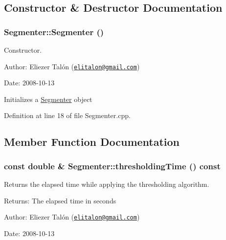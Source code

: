 \subsection{Constructor \& Destructor Documentation}
\hypertarget{class_segmenter_d39ec3bda31be180820aa0bdca7b125d}{
\subsubsection[Segmenter]{\setlength{\rightskip}{0pt plus 5cm}Segmenter::Segmenter ()}}
\label{class_segmenter_d39ec3bda31be180820aa0bdca7b125d}


Constructor. 

\begin{Desc}
\item[Author:]Eliezer Talón (\href{mailto:elitalon@gmail.com}{\tt elitalon@gmail.com}) \end{Desc}
\begin{Desc}
\item[Date:]2008-10-13\end{Desc}
Initializes a \hyperlink{class_segmenter}{Segmenter} object 

Definition at line 18 of file Segmenter.cpp.

\subsection{Member Function Documentation}
\hypertarget{class_segmenter_52f771c61d667df4f552ee73dc9f22e7}{
\subsubsection[thresholdingTime]{\setlength{\rightskip}{0pt plus 5cm}const double \& Segmenter::thresholdingTime () const}}
\label{class_segmenter_52f771c61d667df4f552ee73dc9f22e7}


Returns the elapsed time while applying the thresholding algorithm. 

\begin{Desc}
\item[Returns:]The elapsed time in seconds\end{Desc}
\begin{Desc}
\item[Author:]Eliezer Talón (\href{mailto:elitalon@gmail.com}{\tt elitalon@gmail.com}) \end{Desc}
\begin{Desc}
\item[Date:]2008-10-13 \end{Desc}


